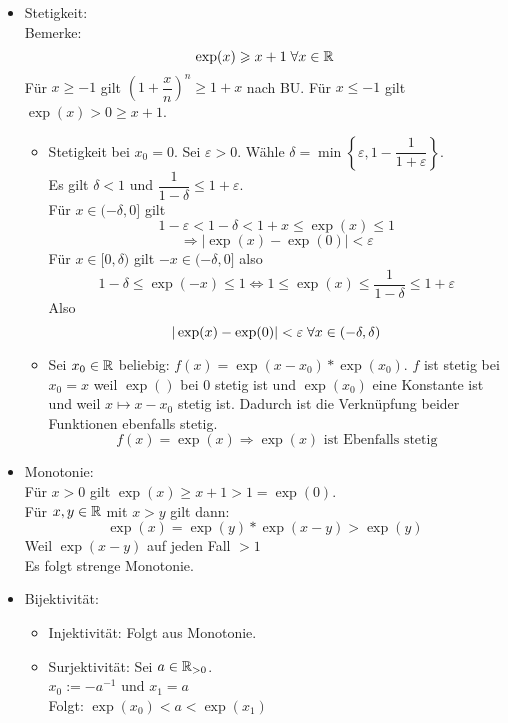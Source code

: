 \documentclass[main.tex]{subfiles}
\begin{document}
\begin{Beweis}[Konsequenzen]
\begin{itemize}
    \item Stetigkeit:\\
      Bemerke:
      $$\exp(x) \geqslant x+1 \;\forall x\in\mathbb{R}$$
      Für $x \geq -1$ gilt $\left(1+\dfrac{x}{n}\right)^n \geq 1+x$ nach BU. Für $x \leq -1$ gilt $\exp(x) > 0 \geq x+1$.
      \begin{itemize}
        \item Stetigkeit bei $x_0 = 0$. Sei $\varepsilon > 0$. Wähle $\delta = \min\left\{\varepsilon, 1 - \dfrac{1}{1+\varepsilon}\right\}$.\\
          Es gilt $\delta < 1$ und $\dfrac{1}{1-\delta} \leq 1 + \varepsilon$.\\
          Für $x \in (-\delta,0]$ gilt
          $$1- \varepsilon < 1 - \delta < 1+ x \leq \exp(x) \leq 1$$
          $$\Rightarrow |\exp(x) - \exp(0)| < \varepsilon$$
          Für $x \in [0,\delta)$ gilt $-x \in (-\delta,0]$ also
          $$1 - \delta \leq \exp(-x) \leq 1 \Leftrightarrow 1 \leq \exp(x) \leq \dfrac{1}{1-\delta} \leq 1 + \varepsilon$$
          Also
          $$|\exp(x) - \exp(0)| < \varepsilon \;\forall x \in (-\delta,\delta)$$
        \item Sei $x_0 \in \mathbb{R}$ beliebig: $f(x) = \exp(x-x_0)*\exp(x_0)$. $f$ ist stetig bei $x_0 = x$ weil $\exp()$ bei $0$ stetig ist und $\exp(x_0)$ eine Konstante ist und weil $x \mapsto x - x_0$ stetig ist. Dadurch ist die Verknüpfung beider Funktionen ebenfalls stetig.
          $$f(x) = \exp(x) \Rightarrow \exp(x) \text{ ist Ebenfalls stetig}$$
      \end{itemize}
    \item Monotonie:\\
      Für $x > 0$ gilt $\exp(x) \geq x + 1 > 1 = \exp(0)$.\\
      Für $x,y \in \mathbb{R}$ mit $x>y$ gilt dann:
      $$\exp(x) = \exp(y) * \exp(x-y) > \exp(y)$$
      Weil $\exp(x-y)$ auf jeden Fall $> 1$\\
      Es folgt strenge Monotonie.
    \item Bijektivität:
      \begin{itemize}
        \item Injektivität: Folgt aus Monotonie.
        \item Surjektivität: Sei $a \in \mathbb{R}_{>0}$.\\
          $x_0 := -a^{-1}$ und $x_1=a$\\
          Folgt: $\exp(x_0) < a < \exp(x_1)$
      \end{itemize}
  \end{itemize}
\end{Beweis}
\end{document}
